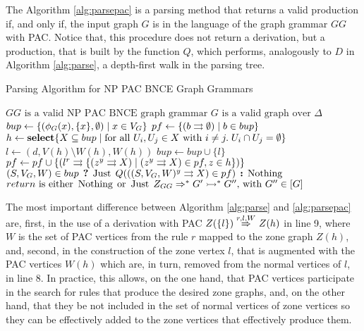 The Algorithm \ref{alg:parsepac} is a parsing method that returns a valid production if, and only if, the input graph $G$ is in the language of the graph grammar $GG$ with PAC. Notice that, this procedure does not return a derivation, but a production, that is built by the function $Q$, which performs, analogously to $D$ in Algorithm \ref{alg:parse}, a depth-first walk in the parsing tree.

\begin{algorithm}[!h]
	\caption{Parsing Algorithm for NP PAC BNCE Graph Grammars}
	\begin{algorithmic}[1]
		\Require $GG \text{ is a valid NP PAC BNCE graph grammar}$
		\Require $G \text{ is a valid graph over } \Delta$
		\State $bup \gets \{(\phi_G(x),\{x\},\emptyset) \; | \; x \in V_G\}$
		\State $pf \gets \{ \ptree{b}{}{\emptyset} \st b \in bup \}$
		\Repeat
			\State $h \gets \text{\textbf{select}} \{X \subseteq bup \; | \;\text{for all } U_i, U_j \in X \text{ with } i \neq j . \; U_i \cap U_j = \emptyset \}$
					\State $l \gets (d,V(h)\setminus W(h), W(h))$ 
					 
					\State $bup \gets bup \cup \{l\}$
					\State $pf \gets pf \cup \{ \ptree{l}{r}{\{\ptree{z}{y}{X} \st \ptree{z}{y}{X} \in pf, z \in h \}} \}$
					\EndIf
				\EndFor
			\EndFor
		 
		\State \Return $(S, V_G, W) \in bup \? \Just Q(\ptree{(S,V_G, W)}{y}{X} \in pf) \: \Nothing $
		\EndFunction
		\Ensure $return \text{ is either } \operatorname{\text{Nothing}}\; \text{or } \operatorname{\text{Just}}\; Z_{GG} \Rightarrow^*_{} G' \rightarrowtail^* G'' \text{, with } G'' \in [G]$
	\end{algorithmic}
	\label{alg:parsepac}
\end{algorithm}

The most important difference between Algorithm \ref{alg:parse} and \ref{alg:parsepac} are, first, in the use of a derivation with PAC $Z(\{l\}) \derivpac{r}{l}{W}{} Z(h)$ in line 9, where $W$ is the set of PAC vertices from the rule $r$ mapped to the zone graph $Z(h)$, and, second, in the construction of the zone vertex $l$, that is augmented with the PAC vertices $W(h)$ which are, in turn, removed from the normal vertices of $l$, in line 8. In practice, this allows, on the one hand, that PAC vertices participate in the search for rules that produce the desired zone graphs, and, on the other hand, that they be not included in the set of normal vertices of zone vertices so they can be effectively added to the zone vertices that effectively produce them.

